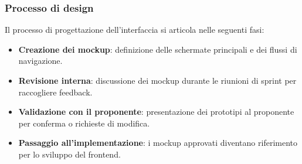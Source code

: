 \documentclass[a4paper, 11pt, oneside]{scrartcl} %
\begin{document}
\subsubsection{Processo di design}
Il processo di progettazione dell'interfaccia si articola nelle seguenti fasi:
\begin{itemize}
    \item \textbf{Creazione dei mockup}: definizione delle schermate principali e dei flussi di navigazione.
    \item \textbf{Revisione interna}: discussione dei mockup durante le riunioni di sprint per raccogliere feedback.
    \item \textbf{Validazione con il proponente}: presentazione dei prototipi al proponente per conferma o richieste di modifica.
    \item \textbf{Passaggio all'implementazione}: i mockup approvati diventano riferimento per lo sviluppo del frontend.
\end{itemize}
\end{document}

